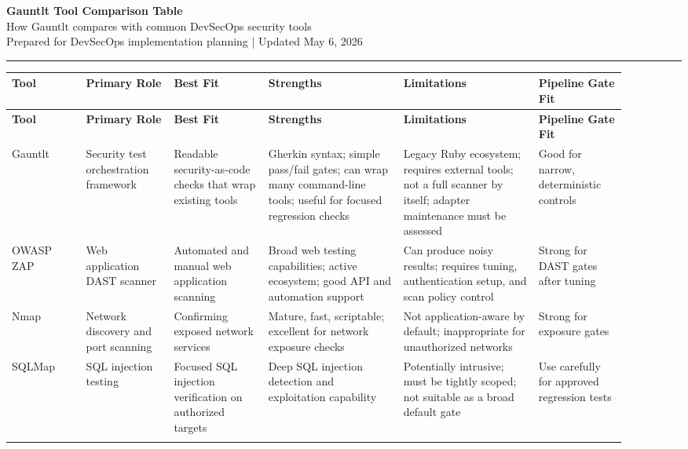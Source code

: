 \documentclass[10pt]{article}
\begin{document}
\begin{center}
{\LARGE\bfseries\color{HeaderBlue} Gauntlt Tool Comparison Table}\\[0.25em]
{\large How Gauntlt compares with common DevSecOps security tools}\\[0.25em]
{\small Prepared for DevSecOps implementation planning | Updated May 6, 2026}
\end{center}
\vspace{0.3em}\hrule\vspace{0.6em}

\scriptsize
\begin{longtable}{@{}L{0.11\linewidth}L{0.13\linewidth}L{0.14\linewidth}L{0.20\linewidth}L{0.20\linewidth}L{0.13\linewidth}@{}}
\toprule
\textbf{Tool} & \textbf{Primary Role} & \textbf{Best Fit} & \textbf{Strengths} & \textbf{Limitations} & \textbf{Pipeline Gate Fit} \\
\midrule
\endfirsthead
\toprule
\textbf{Tool} & \textbf{Primary Role} & \textbf{Best Fit} & \textbf{Strengths} & \textbf{Limitations} & \textbf{Pipeline Gate Fit} \\
\midrule
\endhead
Gauntlt & Security test orchestration framework & Readable security-as-code checks that wrap existing tools & Gherkin syntax; simple pass/fail gates; can wrap many command-line tools; useful for focused regression checks & Legacy Ruby ecosystem; requires external tools; not a full scanner by itself; adapter maintenance must be assessed & Good for narrow, deterministic controls \\
\addlinespace
OWASP ZAP & Web application DAST scanner & Automated and manual web application scanning & Broad web testing capabilities; active ecosystem; good API and automation support & Can produce noisy results; requires tuning, authentication setup, and scan policy control & Strong for DAST gates after tuning \\
\addlinespace
Nmap & Network discovery and port scanning & Confirming exposed network services & Mature, fast, scriptable; excellent for network exposure checks & Not application-aware by default; inappropriate for unauthorized networks & Strong for exposure gates \\
\addlinespace
SQLMap & SQL injection testing & Focused SQL injection verification on authorized targets & Deep SQL injection detection and exploitation capability & Potentially intrusive; must be tightly scoped; not suitable as a broad default gate & Use carefully for approved regression tests \\
\addlinespace

\end{longtable}
\end{document}
